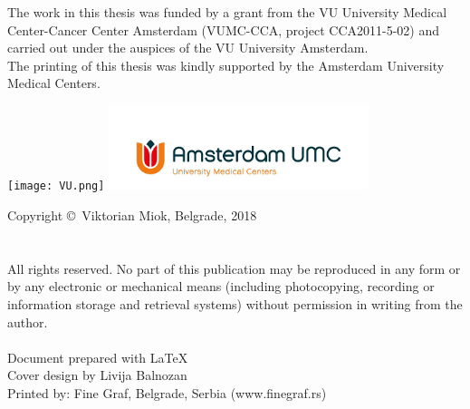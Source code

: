 \documentclass[notitlepage,twoside,10pt,openright,leqno]{Classes/PhDThesisPSnPDF} %
\begin{document}
\frontmatter





\thispagestyle{empty}
\begin{center}
\vspace{2.5cm}
  \vspace{2.5cm}
\end{center}

\newpage
\thispagestyle{empty}
\noindent The work in this thesis was funded by a grant from the VU University Medical Center-Cancer Center Amsterdam (VUMC-CCA, project CCA2011-5-02) and carried out under the auspices of the VU University Amsterdam.\\

\noindent The printing of this thesis was kindly supported by the Amsterdam University \\ Medical Centers.\\
\begin{center}
	\null\hspace{\fill}
  	\texttt{[image: VU.png]}%
  	\null\hspace{2cm}
  	\includegraphics[width=0.57\textwidth]{AUMC.png}
  	\hspace{\fill}\null
\end{center}
\null

\vfill

\noindent
Copyright {\selectfont \copyright}~Viktorian Miok, Belgrade, 2018\\
\\
\vspace{0.2cm}\\
\noindent
All rights reserved. No part of this publication may be reproduced in any form or by
any electronic or mechanical means (including photocopying, recording or information
storage and retrieval systems) without permission in writing from the author.
\\
\\
Document prepared with {\selectfont \LaTeX} \\
Cover design by Livija Balnozan\\
Printed by: Fine Graf, Belgrade, Serbia (www.finegraf.rs)
\end{document}
